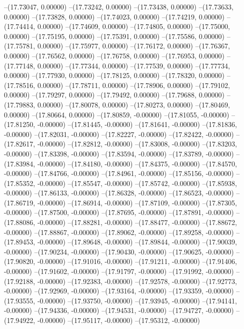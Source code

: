 --(17.73047, 0.00000)
--(17.73242, 0.00000)
--(17.73438, 0.00000)
--(17.73633, 0.00000)
--(17.73828, 0.00000)
--(17.74023, 0.00000)
--(17.74219, 0.00000)
--(17.74414, 0.00000)
--(17.74609, 0.00000)
--(17.74805, 0.00000)
--(17.75000, 0.00000)
--(17.75195, 0.00000)
--(17.75391, 0.00000)
--(17.75586, 0.00000)
--(17.75781, 0.00000)
--(17.75977, 0.00000)
--(17.76172, 0.00000)
--(17.76367, 0.00000)
--(17.76562, 0.00000)
--(17.76758, 0.00000)
--(17.76953, 0.00000)
--(17.77148, 0.00000)
--(17.77344, 0.00000)
--(17.77539, 0.00000)
--(17.77734, 0.00000)
--(17.77930, 0.00000)
--(17.78125, 0.00000)
--(17.78320, 0.00000)
--(17.78516, 0.00000)
--(17.78711, 0.00000)
--(17.78906, 0.00000)
--(17.79102, 0.00000)
--(17.79297, 0.00000)
--(17.79492, 0.00000)
--(17.79688, 0.00000)
--(17.79883, 0.00000)
--(17.80078, 0.00000)
--(17.80273, 0.00000)
--(17.80469, 0.00000)
--(17.80664, 0.00000)
--(17.80859, -0.00000)
--(17.81055, -0.00000)
--(17.81250, -0.00000)
--(17.81445, -0.00000)
--(17.81641, -0.00000)
--(17.81836, -0.00000)
--(17.82031, -0.00000)
--(17.82227, -0.00000)
--(17.82422, -0.00000)
--(17.82617, -0.00000)
--(17.82812, -0.00000)
--(17.83008, -0.00000)
--(17.83203, -0.00000)
--(17.83398, -0.00000)
--(17.83594, -0.00000)
--(17.83789, -0.00000)
--(17.83984, -0.00000)
--(17.84180, -0.00000)
--(17.84375, -0.00000)
--(17.84570, -0.00000)
--(17.84766, -0.00000)
--(17.84961, -0.00000)
--(17.85156, -0.00000)
--(17.85352, -0.00000)
--(17.85547, -0.00000)
--(17.85742, -0.00000)
--(17.85938, -0.00000)
--(17.86133, -0.00000)
--(17.86328, -0.00000)
--(17.86523, -0.00000)
--(17.86719, -0.00000)
--(17.86914, -0.00000)
--(17.87109, -0.00000)
--(17.87305, -0.00000)
--(17.87500, -0.00000)
--(17.87695, -0.00000)
--(17.87891, -0.00000)
--(17.88086, -0.00000)
--(17.88281, -0.00000)
--(17.88477, -0.00000)
--(17.88672, -0.00000)
--(17.88867, -0.00000)
--(17.89062, -0.00000)
--(17.89258, -0.00000)
--(17.89453, -0.00000)
--(17.89648, -0.00000)
--(17.89844, -0.00000)
--(17.90039, -0.00000)
--(17.90234, -0.00000)
--(17.90430, -0.00000)
--(17.90625, -0.00000)
--(17.90820, -0.00000)
--(17.91016, -0.00000)
--(17.91211, -0.00000)
--(17.91406, -0.00000)
--(17.91602, -0.00000)
--(17.91797, -0.00000)
--(17.91992, -0.00000)
--(17.92188, -0.00000)
--(17.92383, -0.00000)
--(17.92578, -0.00000)
--(17.92773, -0.00000)
--(17.92969, -0.00000)
--(17.93164, -0.00000)
--(17.93359, -0.00000)
--(17.93555, -0.00000)
--(17.93750, -0.00000)
--(17.93945, -0.00000)
--(17.94141, -0.00000)
--(17.94336, -0.00000)
--(17.94531, -0.00000)
--(17.94727, -0.00000)
--(17.94922, -0.00000)
--(17.95117, -0.00000)
--(17.95312, -0.00000)
